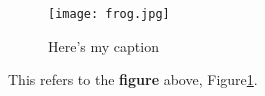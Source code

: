 \begin{figure}[H]
	\centering %
	\texttt{[image: frog.jpg]}
	\caption{Here's my caption} %
	\label{fig:frog}
\end{figure}

This refers to the \textbf{ figure} above, Figure\ref{fig:frog}.
